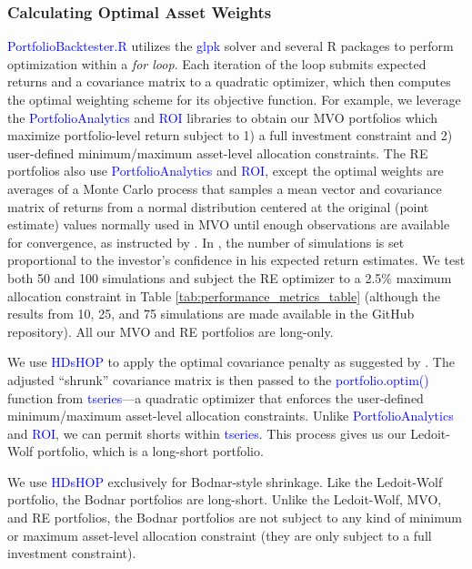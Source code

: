 \documentclass[12pt,letterpaper]{article}
\begin{document}
\subsubsection{Calculating Optimal Asset Weights}
\textcolor{blue}{PortfolioBacktester.R} utilizes the \textcolor{blue}{glpk} solver and several R packages to perform optimization within a \textit{for loop}. Each iteration of the loop submits expected returns and a covariance matrix to a quadratic optimizer, which then computes the optimal weighting scheme for its objective function. For example, we leverage the \textcolor{blue}{PortfolioAnalytics} and \textcolor{blue}{ROI} libraries to obtain our MVO portfolios which maximize portfolio-level return subject to 1) a full investment constraint and 2) user-defined minimum/maximum asset-level allocation constraints. The RE portfolios also use \textcolor{blue}{PortfolioAnalytics} and \textcolor{blue}{ROI}, except the optimal weights are averages of a Monte Carlo process that samples a mean vector and covariance matrix of returns from a normal distribution centered at the original (point estimate) values normally used in MVO until enough observations are available for convergence, as instructed by . In , the number of simulations is set proportional to the investor's confidence in his expected return estimates. We test both 50 and 100 simulations and subject the RE optimizer to a 2.5\% maximum allocation constraint in Table \ref{tab:performance_metrics_table} (although the results from 10, 25, and 75 simulations are made available in the GitHub repository). All our MVO and RE portfolios are long-only.

We use \textcolor{blue}{HDsHOP} to apply the optimal covariance penalty as suggested by . The adjusted “shrunk” covariance matrix is then passed to the \textcolor{blue}{portfolio.optim()} function from \textcolor{blue}{tseries}---a quadratic optimizer that enforces the user-defined minimum/maximum asset-level allocation constraints. Unlike \textcolor{blue}{PortfolioAnalytics} and \textcolor{blue}{ROI}, we can permit shorts within \textcolor{blue}{tseries}. This process gives us our Ledoit-Wolf portfolio, which is a long-short portfolio.

We use \textcolor{blue}{HDsHOP} exclusively for Bodnar-style shrinkage. Like the Ledoit-Wolf portfolio, the Bodnar portfolios are long-short. Unlike the Ledoit-Wolf, MVO, and RE portfolios, the Bodnar portfolios are not subject to any kind of minimum or maximum asset-level allocation constraint (they are only subject to a full investment constraint).
\end{document}
